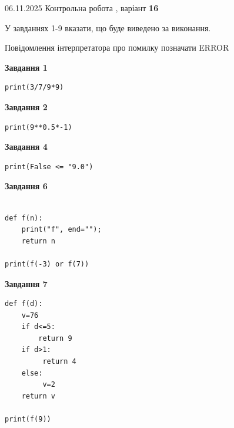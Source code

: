 \documentclass[12pt, ukrainian]{article}
\begin{document}
{\Large{06.11.2025 Контрольна робота , варіант  \No \textbf { 16 }\par}}
{
\begin {large}
У завданнях 1-9 вказати, що буде виведено за виконання.

Повідомлення інтерпретатора про помилку позначати ERROR

\begin{minipage}[t]{7.5cm}

\begin{center}
\textbf{Завдання 1}
\end{center}

\begin{verbatim}
print(3/7/9*9)
\end{verbatim}



\begin{center}
\textbf{Завдання 2}
\end{center}

\begin{verbatim}
print(9**0.5*-1)
\end{verbatim}



\begin{center}
\textbf{Завдання 4}
\end{center}

\begin{verbatim}
print(False <= "9.0")
\end{verbatim}



\begin{center}
\textbf{Завдання 6}
\end{center}

\begin{verbatim}

def f(n):
    print("f", end="");
    return n

print(f(-3) or f(7))
\end{verbatim}



\begin{center}
\textbf{Завдання 7}
\end{center}

\begin{verbatim}
def f(d):
    v=76
    if d<=5: 
        return 9
    if d>1:
         return 4
    else:
         v=2
    return v

print(f(9))
\end{verbatim}


\end{minipage}
\end{large}}
\end{document}
